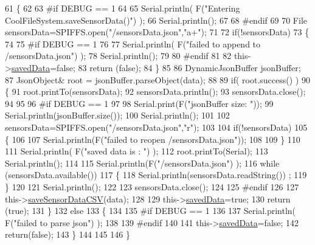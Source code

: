 \begin{DoxyCode}
61 \{
62 
63 \textcolor{preprocessor}{#if DEBUG == 1}
64 
65     Serial.println( F(\textcolor{stringliteral}{"Entering CoolFileSystem.saveSensorData()"}) );
66     Serial.println();
67 
68 \textcolor{preprocessor}{#endif}
69     
70     File sensorsData=SPIFFS.open(\textcolor{stringliteral}{"/sensorsData.json"},\textcolor{stringliteral}{"a+"});
71 
72     \textcolor{keywordflow}{if}(!sensorsData)
73     \{
74     
75 \textcolor{preprocessor}{    #if DEBUG == 1}
76     
77         Serial.println( F(\textcolor{stringliteral}{"failed to append to /sensorsData.json"}) );
78         Serial.println();
79     
80 \textcolor{preprocessor}{    #endif}
81 
82         this->\hyperlink{classCoolFileSystem_ad398e0c5c41a0c88acdf5d672aa71351}{savedData}=\textcolor{keyword}{false};
83         \textcolor{keywordflow}{return} (\textcolor{keyword}{false}); 
84     \}   
85 
86     DynamicJsonBuffer jsonBuffer;
87     JsonObject& root = jsonBuffer.parseObject(data);
88 
89     \textcolor{keywordflow}{if}( root.success() )
90     \{
91         root.printTo(sensorsData);
92         sensorsData.println();
93         sensorsData.close();
94 
95 
96 \textcolor{preprocessor}{    #if DEBUG == 1}
97         
98         Serial.print(F(\textcolor{stringliteral}{"jsonBuffer size: "}));
99         Serial.println(jsonBuffer.size());
100         Serial.println();
101 
102         sensorsData=SPIFFS.open(\textcolor{stringliteral}{"/sensorsData.json"},\textcolor{stringliteral}{"r"});
103         
104         \textcolor{keywordflow}{if}(!sensorsData)
105         \{
106             
107             Serial.println(F(\textcolor{stringliteral}{"failed to reopen /sensorsData.json"}));
108                         
109         \}
110     
111         Serial.println( F(\textcolor{stringliteral}{"saved data is : "}) );
112         root.printTo(Serial);
113         Serial.println();
114 
115         Serial.println(F(\textcolor{stringliteral}{"/sensorsData.json"}) );
116         \textcolor{keywordflow}{while} (sensorsData.available()) 
117         \{
118             Serial.println(sensorsData.readString()) ;
119         \}
120         
121         Serial.println();
122         
123         sensorsData.close();
124     
125 \textcolor{preprocessor}{    #endif}
126 
127         this->\hyperlink{classCoolFileSystem_ab78704d5d21ce10fc6f1138ab5ab46c8}{saveSensorDataCSV}(data);     
128 
129         this->\hyperlink{classCoolFileSystem_ad398e0c5c41a0c88acdf5d672aa71351}{savedData}=\textcolor{keyword}{true};
130         \textcolor{keywordflow}{return} (\textcolor{keyword}{true});      
131     \}
132     \textcolor{keywordflow}{else}
133     \{
134     
135 \textcolor{preprocessor}{    #if DEBUG == 1}
136 
137         Serial.println( F(\textcolor{stringliteral}{"failed to parse json"}) );
138     
139 \textcolor{preprocessor}{    #endif}
140 
141         this->\hyperlink{classCoolFileSystem_ad398e0c5c41a0c88acdf5d672aa71351}{savedData}=\textcolor{keyword}{false};
142         \textcolor{keywordflow}{return}(\textcolor{keyword}{false});
143     \}
144     
145 
146 \}
\end{DoxyCode}
